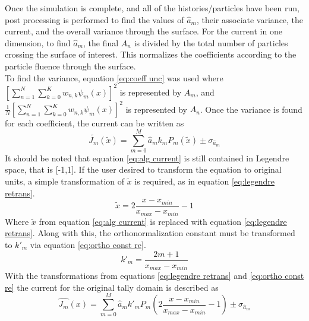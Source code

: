 \documentclass[10tma4paper]{article}
\begin{document}
Once the simulation is complete, and all of the histories/particles have been run, post processing  is performed to find the values of $\hat{a}_{m}$, their associate variance, the current, and the overall variance through the surface. For the current in one dimension, to find $\hat{a}_{m}$, the final $A_{n}$ is divided by the total number of particles crossing the surface of interest. This normalizes the coefficients according to the particle fluence through the surface. 
\\
To find the variance, equation \eqref{eq:coeff unc} was used where $[\sum_{n=1}^{N}\sum_{k=0}^{K}w_{n,k}\psi_{m}(x)]^{2}$ is represented by $A_{m}$, and $\frac{1}{N}[\sum_{n=1}^{N}\sum_{k=0}^{K}w_{n,k}\psi_{m}(x)]^2$ is represented by $A_{n}$. Once the variance is found for each coefficient, the current can be written as
\begin{equation}\label{eq:alg current}
	\tilde{J_{m}}(\tilde{x}) = \sum_{m=0}^{M}\hat{a}_{m}k_{m}P_{m}(\tilde{x}) \pm  \sigma_{\hat{a}_{m}}
\end{equation}
It should be noted that equation \eqref{eq:alg current} is still contained in Legendre space, that is [-1,1]. If the user desired to transform the equation to original units, a simple transformation of $\tilde{x}$ is required, as in equation \eqref{eq:legendre retrans}.
\begin{equation}\label{eq:legendre retrans}
\tilde{x} = 2\frac{x-x_{min}}{x_{max}-x_{min}}-1
\end{equation}
Where $\tilde{x}$ from equation \eqref{eq:alg current} is replaced with equation \eqref{eq:legendre retrans}. Along with this, the orthonormalization constant must be transformed to $k'_{m}$ via equation \eqref{eq:ortho const re}.
\begin{equation}\label{eq:ortho const re}
k'_{m} = \frac{2m+1}{x_{max}-x_{min}}
\end{equation}
With the transformations from equations \eqref{eq:legendre retrans} and \eqref{eq:ortho const re} the current for the original tally domain is described as 
\begin{equation}\label{eq:final current}
	\hat{J_{m}}(x) = \sum_{m=0}^{M}\hat{a}_{m}k'_{m}P_{m}(2\frac{x-x_{min}}{x_{max}-x_{min}}-1) \pm  \sigma_{\hat{a}_{m}}
\end{equation}
\end{document}
